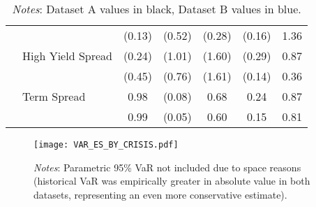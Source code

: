 \documentclass[12pt]{article}
\begin{document}
\begin{table}[H]
{\begin{tabular}{@{}llccccc@{}}
                              &                   & {\color[HTML]{303498} (0.13)}         & {\color[HTML]{303498} (0.52)}   & {\color[HTML]{303498} (0.28)}        & {\color[HTML]{303498} (0.16)}   & {\color[HTML]{303498} 1.36}          \\
                              & High Yield Spread & (0.24)                                & (1.01)                          & (1.60)                               & (0.29)                          & 0.87                                 \\
                              &                   & {\color[HTML]{303498} (0.45)}         & {\color[HTML]{303498} (0.76)}   & {\color[HTML]{303498} (1.61)}        & {\color[HTML]{303498} (0.14)}   & {\color[HTML]{303498} 0.36}          \\
                              & Term Spread       & 0.98                                  & (0.08)                          & 0.68                                 & 0.24                            & 0.87                                 \\
                              &                   & {\color[HTML]{303498} 0.99}           & {\color[HTML]{303498} (0.05)}   & {\color[HTML]{303498} 0.60}          & {\color[HTML]{303498} 0.15}     & {\color[HTML]{303498} 0.81}          \\ \bottomrule
\end{tabular}}
\medskip
\caption*{\textit{Notes}: Dataset A values in black, Dataset B values in blue.}
\end{table}

\begin{figure}[H]
\centering
\begin{minipage}[b]{\textwidth}
\centering
{}
\texttt{[image: VAR\_ES\_BY\_CRISIS.pdf]}
\bigskip
\caption*{\textit{Notes}: Parametric 95\% VaR not included due to space reasons (historical VaR was empirically greater in absolute value in both datasets, representing an even more conservative estimate).}
\label{fig:figure10}
\end{minipage}
\end{figure}
\end{document}
